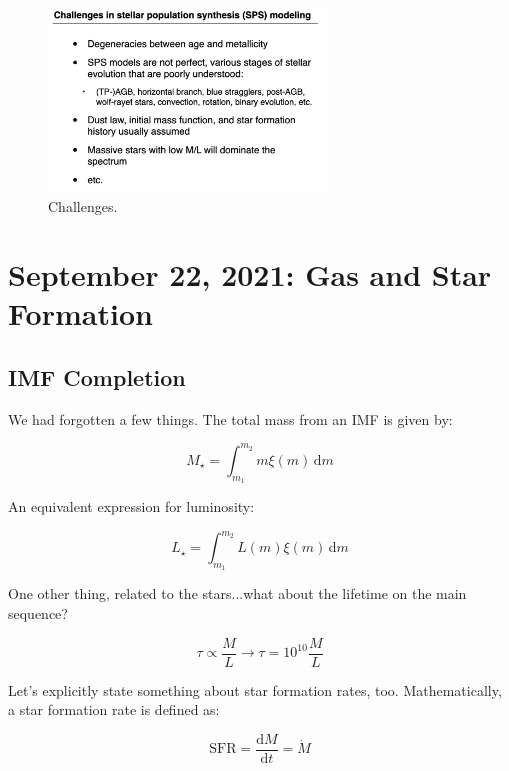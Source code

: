 \documentclass{article}
\begin{document}
\begin{figure}
    \centering
    \includegraphics[width=0.66\textwidth]{figs/Screen Shot 2021-09-24 at 9.35.27 AM.png}
    \caption{Challenges.}
    \label{fig:Challenges}
\end{figure}


\section{September 22, 2021: Gas and Star Formation}

\subsection{IMF Completion}

We had forgotten a few things. The total mass from an IMF is given by:

\begin{equation}
    M_\star = \int_{m_1}^{m_2} m \xi(m) \,\mathrm{d}m
\end{equation}

An equivalent expression for luminosity:

\begin{equation}
    L_\star = \int_{m_1}^{m_2} L(m) \xi(m) \,\mathrm{d}m
\end{equation}

One other thing, related to the stars...what about the lifetime on the main sequence?

\begin{equation}
    \tau \propto \frac{M}{L} \rightarrow \tau = 10^{10} \frac{M}{L}
\end{equation}

Let's explicitly state something about star formation rates, too. Mathematically, a star formation rate is defined as:

\begin{equation}
    \text{SFR} = \frac{\mathrm{d}M}{\mathrm{d}t} = \dot{M}
\end{equation}
\end{document}

